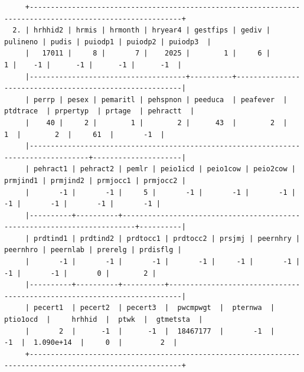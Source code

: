 \documentclass[
]{book}
\begin{document}
\begin{verbatim}
     +----------------------------------------------------------------------------------------------------------+
  2. | hrhhid2 | hrmis | hrmonth | hryear4 | gestfips | gediv | pulineno | pudis | puiodp1 | puiodp2 | puiodp3  |
     |   17011 |     8 |       7 |    2025 |        1 |     6 |        1 |    -1 |      -1 |      -1 |      -1  |
     |-------------------------------------+----------+---------------------------------------------------------|
     | perrp | pesex | pemaritl | pehspnon | peeduca  | peafever  | ptdtrace  | prpertyp  | prtage  | pehractt  |
     |    40 |     2 |        1 |        2 |      43  |        2  |        1  |        2  |     61  |       -1  |
     |------------------------------------------------------------------------------------+---------------------|
     | pehract1 | pehract2 | pemlr | peio1icd | peio1cow | peio2cow | prmjind1 | prmjind2 | prmjocc1 | prmjocc2 |
     |       -1 |       -1 |     5 |       -1 |       -1 |       -1 |       -1 |       -1 |       -1 |       -1 |
     |----------+----------+-------------------------------------------------------------------------+----------|
     | prdtind1 | prdtind2 | prdtocc1 | prdtocc2 | prsjmj | peernhry | peernhro | peernlab | prerelg | prdisflg |
     |       -1 |       -1 |       -1 |       -1 |     -1 |       -1 |       -1 |       -1 |       0 |        2 |
     |----------+----------+----------+-------------------------------------------------------------------------|
     | pecert1  | pecert2  | pecert3  |  pwcmpwgt  |  pternwa  |  ptio1ocd  |     hrhhid  |  ptwk  |  gtmetsta  |
     |       2  |      -1  |      -1  |  18467177  |       -1  |        -1  |  1.090e+14  |     0  |         2  |
     +----------------------------------------------------------------------------------------------------------+


\end{verbatim}
\end{document}
